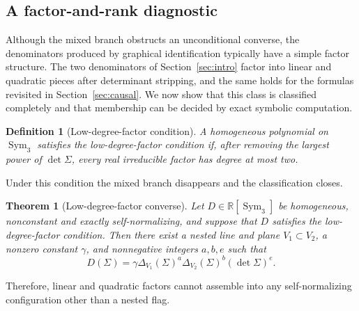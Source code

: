 \documentclass[12pt,a4paper]{article}
\theoremstyle{plain}
\newtheorem{theorem}{Theorem}
\newtheorem{definition}{Definition}
\theoremstyle{definition}
\newcommand{\R}{\mathbb{R}}
\newcommand{\Sym}{\operatorname{Sym}}
\begin{document}
\subsection{A factor-and-rank diagnostic}
Although the mixed branch obstructs an unconditional converse, the denominators produced by graphical identification typically have a simple factor structure.
The two denominators of Section~\ref{sec:intro} factor into linear and quadratic pieces after determinant stripping, and the same holds for the formulas revisited in Section~\ref{sec:causal}.
We now show that this class is classified completely and that membership can be decided by exact symbolic computation.
\begin{definition}[Low-degree-factor condition]
\label{def:low-degree-factor}
    A homogeneous polynomial on $\Sym_3$ satisfies the low-degree-factor condition if, after removing the largest power of $\det\Sigma$, every real irreducible factor has degree at most two.
\end{definition}

Under this condition the mixed branch disappears and the classification closes.
\begin{theorem}[Low-degree-factor converse]
\label{thm:low-degree-factor}
    Let $D\in\R[\Sym_3]$ be homogeneous, nonconstant and exactly self-normalizing, and suppose that $D$ satisfies the low-degree-factor condition.
    Then there exist a nested line and plane $V_1\subset V_2$, a nonzero constant $\gamma$, and nonnegative integers $a,b,e$ such that
    \begin{equation}
    \label{eq:low-degree-flag}
        D(\Sigma)
        =
        \gamma\Delta_{V_1}(\Sigma)^a
        \Delta_{V_2}(\Sigma)^b(\det\Sigma)^e
        .
    \end{equation}
\end{theorem}
Therefore, linear and quadratic factors cannot assemble into any self-normalizing configuration other than a nested flag.
\end{document}
